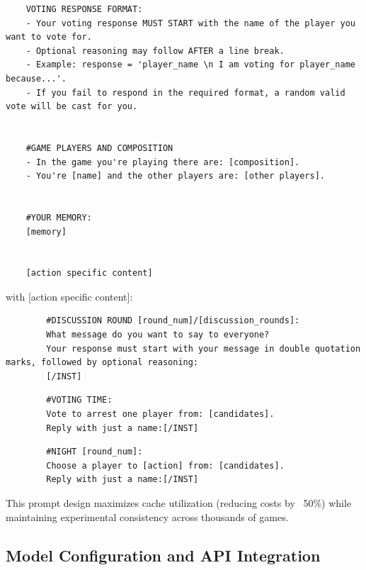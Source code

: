 \documentclass{article}
\begin{document}
\begin{small}
\begin{verbatim}
    VOTING RESPONSE FORMAT: 
    - Your voting response MUST START with the name of the player you want to vote for. 
    - Optional reasoning may follow AFTER a line break.
    - Example: response = 'player_name \n I am voting for player_name because...'.
    - If you fail to respond in the required format, a random valid vote will be cast for you.
    
    
    #GAME PLAYERS AND COMPOSITION
    - In the game you're playing there are: [composition].
    - You're [name] and the other players are: [other players].
    
    
    #YOUR MEMORY:
    [memory]
    
    
    [action specific content]
\end{verbatim}
\end{small}

with [action specific content]:

\begin{small}
    \begin{verbatim}
        #DISCUSSION ROUND [round_num]/[discussion_rounds]: 
        What message do you want to say to everyone?
        Your response must start with your message in double quotation marks, followed by optional reasoning:
        [/INST]
    \end{verbatim}
\end{small}

\begin{small}
    \begin{verbatim}
        #VOTING TIME: 
        Vote to arrest one player from: [candidates].
        Reply with just a name:[/INST]
    \end{verbatim}
\end{small}

\begin{small}
    \begin{verbatim}
        #NIGHT [round_num]: 
        Choose a player to [action] from: [candidates].
        Reply with just a name:[/INST]
    \end{verbatim}
\end{small}


This prompt design maximizes cache utilization (reducing costs by ~50\%) while maintaining experimental consistency across thousands of games.

\subsection{Model Configuration and API Integration}
\end{document}
